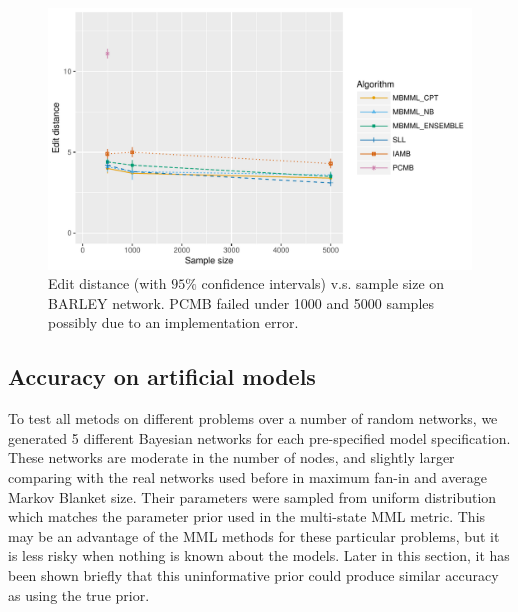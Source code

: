 \documentclass{svmult}
\begin{document}
\begin{figure}[hbt]
  \centering
    \includegraphics[scale=0.6]{figures/ed_vs_samplesize_barley.pdf}
  \caption{Edit distance (with $95\%$ confidence intervals) v.s. sample size on BARLEY network. PCMB failed under 1000 and 5000 samples possibly due to an implementation error.}
  \label{fg:barley}
\end{figure}

\subsection{Accuracy on artificial models} 
\label{sec:exp_artificial}
To test all metods on different problems over a number of random networks, we generated 5 different Bayesian networks for each pre-specified model specification. These networks are moderate in the number of nodes, and slightly larger comparing with the real networks used before in maximum fan-in and average Markov Blanket size. Their parameters were sampled from uniform distribution which matches the parameter prior used in the multi-state MML metric. This may be an advantage of the MML methods for these particular problems, but it is less risky when nothing is known about the models. Later in this section, it has been shown briefly that this uninformative prior could produce similar accuracy as using the true prior.  
\end{document}
